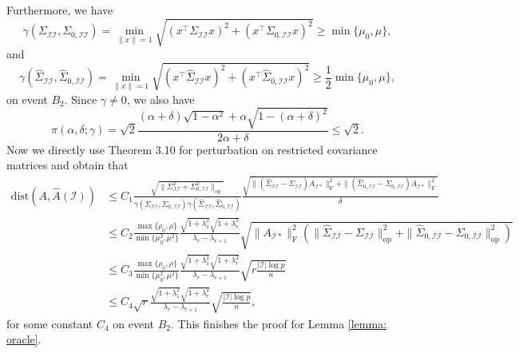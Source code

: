 \documentclass[11pt]{article}
\newcommand{\ha}{\widehat{A}}
\newcommand{\dist}{\mathrm{dist}}
\newcommand{\cI}{{\mathcal{I}}}
\newcommand{\0}{{\mathbf{0}}}
\newcommand{\op}{{\mathrm{op}}}
\begin{document}
\par Furthermore, we have\begin{equation*}
\gamma(\Sigma_{\cI\cI},\Sigma_{0,\cI\cI})=\min_{\|x\|=1}\sqrt{(x^\top\Sigma_{\cI\cI} x)^2+(x^\top\Sigma_{0,\cI\cI} x)^2}\geq \min\{\mu_0,\mu\},
\end{equation*}
and \begin{equation*}
\gamma(\widehat{\Sigma}_{\cI\cI},\widehat{\Sigma}_{0,\cI\cI})=\min_{\|x\|=1}\sqrt{(x^\top\widehat{\Sigma}_{\cI\cI} x)^2+(x^\top\widehat{\Sigma}_{0,\cI\cI} x)^2}\geq \frac{1}{2}\min\{\mu_0,\mu\},
\end{equation*}
on event $B_2$. Since $\gamma\neq 0$, we also have \begin{equation*}
\pi(\alpha,\delta;\gamma)=\sqrt{2}\frac{(\alpha+\delta)\sqrt{1-\alpha^2}+\alpha\sqrt{1-(\alpha+\delta)^2}}{2\alpha+\delta}\leq \sqrt{2}.
\end{equation*}
Now we directly use Theorem 3.10 for perturbation on restricted covariance matrices and obtain that \begin{align*}
\dist(A,\ha(\cI))&\leq C_1\frac{\sqrt{\|\Sigma_{\cI\cI}^2+\Sigma_{0,\cI\cI}^2\|_\op}}{\gamma(\Sigma_{\cI\cI},\Sigma_{0,\cI\cI})\gamma(\widehat{\Sigma}_{\cI\cI},\widehat{\Sigma}_{0,\cI\cI})}\frac{\sqrt{\|(\widehat{\Sigma}_{\cI\cI}-\Sigma_{\cI\cI})A_{\cI*}\|_\mathrm{F}^2+\|(\widehat{\Sigma}_{0,\cI\cI}-\Sigma_{0,\cI\cI})A_{\cI*}\|_\mathrm{F}^2}}{\delta}\\
&\leq C_2 \frac{\max\{\rho_0,\rho\}}{\min\{\mu_0^2,\mu^2\}}\frac{\sqrt{1+\lambda_1^2}\sqrt{{1+\lambda_{r}^2}}}{\lambda_r-\lambda_{r+1}}\sqrt{\|A_{\cI*}\|_\mathrm{F}^2(\|\widehat{\Sigma}_{\cI\cI}-\Sigma_{\cI\cI}\|_\op^2+\|\widehat{\Sigma}_{0,\cI\cI}-\Sigma_{0,\cI\cI}\|_\op^2)}\\
&\leq C_3 \frac{\max\{\rho_0,\rho\}}{\min\{\mu_0^2,\mu^2\}}\frac{\sqrt{1+\lambda_1^2}\sqrt{{1+\lambda_{r}^2}}}{\lambda_r-\lambda_{r+1}}\sqrt{r\frac{|\cI|\log p}{n}}\\
&\leq C_4 \sqrt{r}\frac{\sqrt{1+\lambda_1^2}\sqrt{{1+\lambda_{r}^2}}}{\lambda_r-\lambda_{r+1}}\sqrt{\frac{|\cI|\log p}{n}},
\end{align*}
for some constant $C_4$ on event $B_2$. This finishes the proof for Lemma \ref{lemma: oracle}.

\fi
\end{document}
